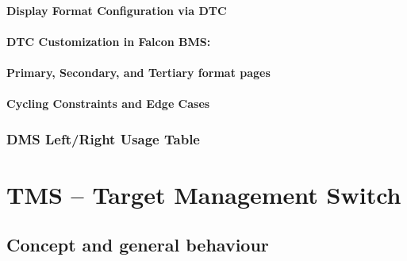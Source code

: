 \documentclass[11pt, a4paper, twoside]{report}
\begin{document}
\subsubsection{Display Format Configuration via DTC}

\subsubsection{DTC Customization in Falcon BMS:}

\subsubsection{Primary, Secondary, and Tertiary format pages}

\subsubsection{Cycling Constraints and Edge Cases}


\subsection{DMS Left/Right Usage Table}

\chapter{TMS -- Target Management Switch}

\section{Concept and general behaviour}
\end{document}
